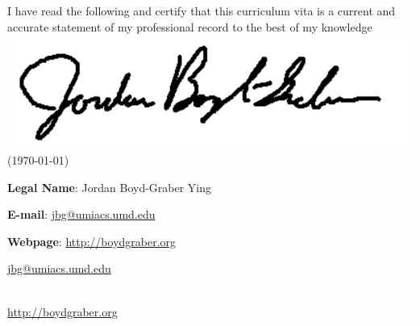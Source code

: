 \usepackage{graphicx}

\newcommand{\umdtext}[2]{
\ifumd
#1 #2
\else
#2
\fi
}


\newcommand{\image}[2]{  \begin{center}
\texttt{[image: images/\#1]}
\end{center}
  }






\ifumd
\vspace{.2cm}
  \parbox{\linewidth}{I have read the following and certify that this
  curriculum vita is a current and accurate statement of my
  professional record to the best of my
  knowledge \flushright  \includegraphics[width=.2\linewidth]{resume_src/signature} \\
\flushright  (\today{})}
\vspace{.5cm}
\fi

\ifumd


\begin{itemize*}
\item {\bf Legal Name}: Jordan Boyd-Graber Ying
\item {\bf E-mail}: \href{mailto:jbg@umiacs.umd.edu}{jbg@umiacs.umd.edu}
  \item {\bf Webpage}:  \href{http://boydgraber.org}{\url{http://boydgraber.org}}
\end{itemize*}

\else

\noindent\href{mailto:jbg@umiacs.umd.edu}{jbg@umiacs.umd.edu}
\umdtext{\\}{\bull} \href{http://boydgraber.org}{\url{http://boydgraber.org}}\\ %

\spacedhrule{0.9em}{-0.4em} %



